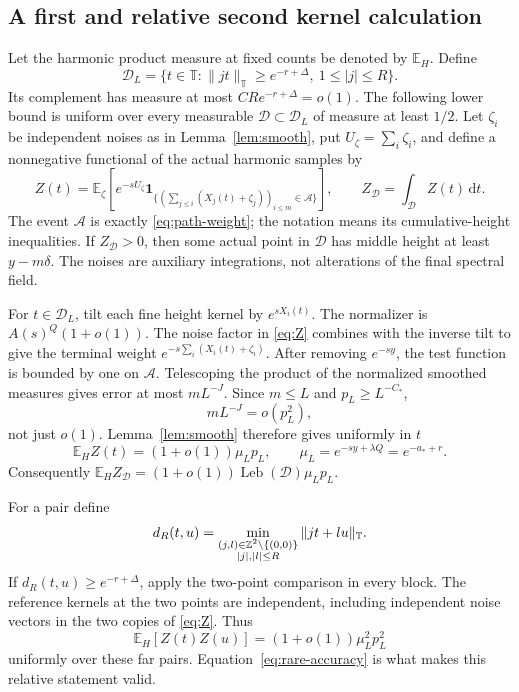 \documentclass[11pt]{article}
\theoremstyle{definition}\newtheorem{definition}[theorem]{Definition}
\theoremstyle{remark}\newtheorem{remark}[theorem]{Remark}
\newcommand{\E}{\mathbb E}\newcommand{\Pp}{\mathbb P}
\newcommand{\T}{\mathbb T}\newcommand{\R}{\mathbb R}\newcommand{\C}{\mathbb C}
\newcommand{\dd}{\,\mathrm d}\newcommand{\ind}{\mathbf1}
\newcommand{\Leb}{\operatorname{Leb}}\newcommand{\TV}{\operatorname{TV}}
\numberwithin{equation}{section}\allowdisplaybreaks
\begin{document}
\subsection{A first and relative second kernel calculation}
Let the harmonic product measure at fixed counts be denoted by $\E_H$.
Define
\[
 \mathcal D_L=\{t\in\T:\|jt\|_\T\ge e^{-r+\Delta},\ 1\le |j|\le R\}.
\]
Its complement has measure at most $CR e^{-r+\Delta}=o(1)$.
The following lower bound is uniform over every measurable
$\mathcal D\subset\mathcal D_L$ of measure at least $1/2$.
Let $\zeta_i$ be independent noises as in Lemma~\ref{lem:smooth}, put
$U_\zeta=\sum_i\zeta_i$, and define a nonnegative functional of the
actual harmonic samples by
\begin{equation}\label{eq:Z}
 Z(t)=\E_\zeta\left[e^{-sU_\zeta}
  \ind_{\{(\sum_{j\le i}(X_j(t)+\zeta_j))_{i\le m}\in\mathcal A\}}
                \right],\qquad Z_{\mathcal D}=\int_{\mathcal D}Z(t)\dd t.
\end{equation}
The event $\mathcal A$ is exactly \eqref{eq:path-weight}; the notation
means its cumulative-height inequalities. If $Z_{\mathcal D}>0$, then
some actual point in $\mathcal D$ has middle height at least $y-m\delta$.
The noises are auxiliary integrations, not alterations of the final
spectral field.

For $t\in\mathcal D_L$, tilt each fine height kernel by $e^{sX_i(t)}$.
The normalizer is $A(s)^Q(1+o(1))$. The noise factor in \eqref{eq:Z}
combines with the inverse tilt to give the terminal weight
$e^{-s\sum_i(X_i(t)+\zeta_i)}$. After removing $e^{-sy}$, the test
function is bounded by one on $\mathcal A$.
Telescoping the product of the normalized smoothed measures gives error
at most $mL^{-J}$. Since $m\le L$ and $p_L\ge L^{-C_*}$,
\begin{equation}\label{eq:rare-accuracy}
 mL^{-J}=o(p_L^2),
\end{equation}
not just $o(1)$. Lemma~\ref{lem:smooth} therefore gives uniformly in $t$
\begin{equation}\label{eq:first-moment}
 \E_H Z(t)=(1+o(1))\mu_Lp_L,\qquad
 \mu_L=e^{-sy+\lambda Q}=e^{-a_*+r}.
\end{equation}
Consequently $\E_H Z_{\mathcal D}=(1+o(1))\Leb(\mathcal D)\mu_Lp_L$.

For a pair define
\[
 d_R(t,u)=\min_{\substack{(j,l)\in\Z^2\setminus\{(0,0)\}\\|j|,|l|\le R}}
                         \|jt+lu\|_\T.
\]
If $d_R(t,u)\ge e^{-r+\Delta}$, apply the two-point comparison in every
block. The reference kernels at the two points are independent, including
independent noise vectors in the two copies of \eqref{eq:Z}. Thus
\begin{equation}\label{eq:far-pair}
 \E_H[Z(t)Z(u)]=(1+o(1))\mu_L^2p_L^2
\end{equation}
uniformly over these far pairs. Equation~\eqref{eq:rare-accuracy} is
what makes this relative statement valid.
\end{document}
